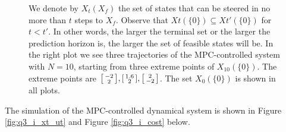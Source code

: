 \documentclass[a4paper,11pt,reqno]{amsart}
\begin{document}
\begin{figure}[H]
    \centering
    \vspace{-0.35cm}
    \subfigtopskip=2pt
    \subfigbottomskip=2pt
    \subfigcapskip=-5pt
    \quad
    \caption{We denote by $X_t(X_f)$ the set of states that can be steered in no more than $t$
    steps to $X_f$. Observe that $Xt(\{0\})\subseteq Xt'(\{0\})$ for $t < t'$. In
    other words, the larger the terminal set or the larger the prediction horizon is, the larger
    the set of feasible states will be. In the right plot we see three trajectories of the
    MPC-controlled system with $N = 10$, starting from three extreme points of $X_{10}(\{0\})$. The extreme points are $\begin{bsmallmatrix}-2\\2\end{bsmallmatrix}, \begin{bsmallmatrix}1.6\\2\end{bsmallmatrix}, \begin{bsmallmatrix}2\\-2\end{bsmallmatrix}$. The set
    $X_0(\{0\})$ is shown in all plots.}
    \label{fig:q3_i_Xx}
\end{figure}
The simulation of the MPC-controlled dynamical system is shown in Figure \ref{fig:q3_i_xt_ut} and Figure \ref{fig:q3_i_cost} below.
\end{document}
